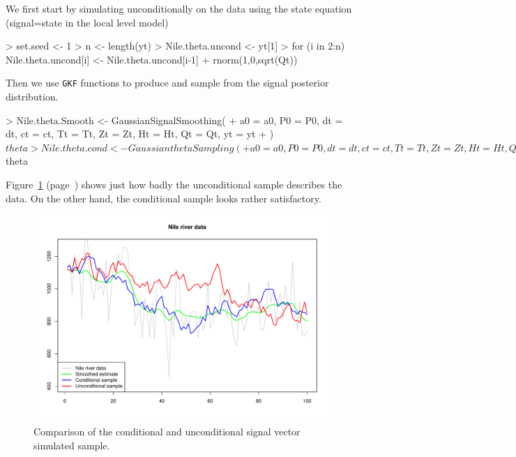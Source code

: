 \documentclass{article}
\newcommand{\GKF}{\texttt{GKF}\xspace}
\begin{document}
We first start by simulating unconditionally on the data using the state equation
(signal=state in the local level model)
\begin{Schunk}
\begin{Sinput}
> set.seed <- 1
> n <- length(yt)
> Nile.theta.uncond <- yt[1]
> for (i in 2:n) Nile.theta.uncond[i] <- Nile.theta.uncond[i-1] + rnorm(1,0,sqrt(Qt))
\end{Sinput}
\end{Schunk}
Then we use \GKF functions to produce and sample from the signal posterior distribution.
\begin{Schunk}
\begin{Sinput}
> Nile.theta.Smooth <- GaussianSignalSmoothing(
+     a0 = a0, P0 = P0, dt = dt, ct = ct, Tt = Tt, Zt = Zt, Ht = Ht, Qt = Qt, yt = yt
+               )$theta
> Nile.theta.cond <- GaussianthetaSampling(
+     a0 = a0, P0 = P0, dt = dt, ct = ct, Tt = Tt, Zt = Zt, Ht = Ht, Qt = Qt, yt = yt,
+          M = 1)$theta
\end{Sinput}
\end{Schunk}
Figure~\ref{fig:DiffSample} (page~\pageref{fig:DiffSample}) shows just how badly
the unconditional sample describes the data. On the other hand, the conditional 
sample looks rather satisfactory.
\begin{figure}[htbp]
  \centering
\includegraphics{vignette-025}
\caption{Comparison of the conditional and unconditional signal vector simulated sample.}
\label{fig:DiffSample}
\end{figure}
\end{document}
